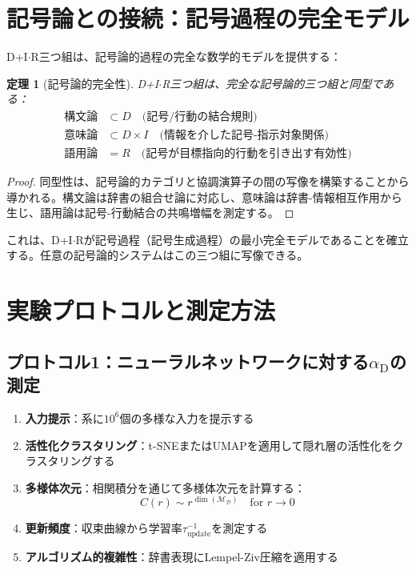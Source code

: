 \documentclass[11pt,a4paper]{article}
\newtheorem{theorem}{定理}
\DeclareMathOperator{\dimension}{dim}
\DeclareRobustCommand{\alD}{\texorpdfstring{\ensuremath{\alpha_{\mathrm{D}}}}{alpha_D}}
\newcommand{\Dict}{\mathcal{D}}
\newcommand{\Mdict}{\mathcal{M}_{\Dict}}
\begin{document}
	\section{記号論との接続：記号過程の完全モデル}
	
	D+I\(\cdot\)R三つ組は、記号論的過程の完全な数学的モデルを提供する：
	
	\begin{theorem}[記号論的完全性]
		D+I\(\cdot\)R三つ組は、完全な記号論的三つ組と同型である：
		\begin{align*}
			\text{構文論} &\subset D \quad \text{(記号/行動の結合規則)} \\
			\text{意味論} &\subset D \times I \quad \text{(情報を介した記号-指示対象関係)} \\
			\text{語用論} &= R \quad \text{(記号が目標指向的行動を引き出す有効性)}
		\end{align*}
	\end{theorem}
	
	\begin{proof}
		同型性は、記号論的カテゴリと協調演算子の間の写像を構築することから導かれる。構文論は辞書の組合せ論に対応し、意味論は辞書-情報相互作用から生じ、語用論は記号-行動結合の共鳴増幅を測定する。
	\end{proof}
	
	これは、D+I\(\cdot\)Rが記号過程（記号生成過程）の最小完全モデルであることを確立する。任意の記号論的システムはこの三つ組に写像できる。
	
	\section{実験プロトコルと測定方法}
	
	\subsection{プロトコル1：ニューラルネットワークに対する\alD の測定}
	\label{subsec:protocol-alpha}
	
	\begin{enumerate}
		\item \textbf{入力提示}：系に\(10^6\)個の多様な入力を提示する
		\item \textbf{活性化クラスタリング}：t-SNEまたはUMAPを適用して隠れ層の活性化をクラスタリングする
		\item \textbf{多様体次元}：相関積分を通じて多様体次元を計算する：
		\[
		C(r) \sim r^{\dimension(\Mdict)} \quad \text{for } r \to 0
		\]
		\item \textbf{更新頻度}：収束曲線から学習率\(\tau_{\mathrm{update}}^{-1}\)を測定する
		\item \textbf{アルゴリズム的複雑性}：辞書表現にLempel-Ziv圧縮を適用する
	\end{enumerate}
	
\end{document}

